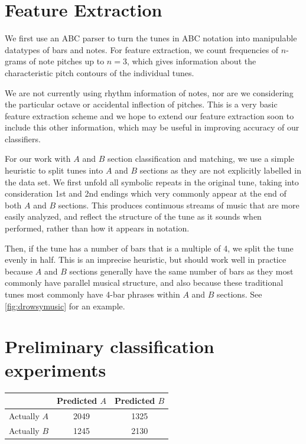 \documentclass{article} %
\begin{document}
\section{Feature Extraction}

We first use an ABC parser to turn the tunes in ABC notation into manipulable
datatypes of bars and notes. For feature extraction, we count frequencies of
$n$-grams of note pitches up to $n=3$, which gives information about the
characteristic pitch contours of the individual tunes.

We are not currently using rhythm information of notes, nor are we considering
the particular octave or accidental inflection of pitches. This is a very basic
feature extraction scheme and we hope to extend our feature extraction soon to
include this other information, which may be useful in improving accuracy of our
classifiers.

For our work with $A$ and $B$ section classification and matching, we use a
simple heuristic to split tunes into $A$ and $B$ sections as they are not
explicitly labelled in the data set. We first unfold all symbolic repeats in the
original tune, taking into consideration 1st and 2nd endings which very commonly
appear at the end of both $A$ and $B$ sections. This produces continuous streams
of music that are more easily analyzed, and reflect the structure of the tune as
it sounds when performed, rather than how it appears in notation.

Then, if the tune has a number of bars that is a multiple of 4, we split the
tune evenly in half. This is an imprecise heuristic, but should work well in
practice because $A$ and $B$ sections generally have the same number of bars as
they most commonly have parallel musical structure, and also because these
traditional tunes most commonly have 4-bar phrases within $A$ and $B$ sections.
See \cref{fig:drowsymusic} for an example.

\section{Preliminary classification experiments}

\begin{center}
\begin{tabular}{c|cc}
             & Predicted $A$ & Predicted $B$ \\ \hline
Actually $A$ & 2049          & 1325          \\
Actually $B$ & 1245          & 2130
\end{tabular}
\end{center}
\end{document}
